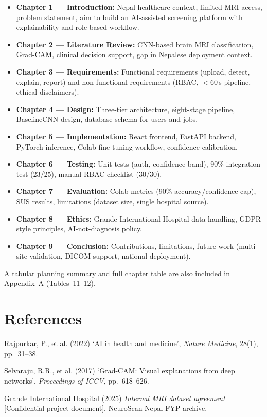\documentclass[11pt,a4paper]{article}
\begin{document}
\begin{itemize}[noitemsep]
  \item \textbf{Chapter 1 --- Introduction:} Nepal healthcare context, limited MRI access, problem statement, aim to build an AI-assisted screening platform with explainability and role-based workflow.
  \item \textbf{Chapter 2 --- Literature Review:} CNN-based brain MRI classification, Grad-CAM, clinical decision support, gap in Nepalese deployment context.
  \item \textbf{Chapter 3 --- Requirements:} Functional requirements (upload, detect, explain, report) and non-functional requirements (RBAC, $<$60\,s pipeline, ethical disclaimers).
  \item \textbf{Chapter 4 --- Design:} Three-tier architecture, eight-stage pipeline, BaselineCNN design, database schema for users and jobs.
  \item \textbf{Chapter 5 --- Implementation:} React frontend, FastAPI backend, PyTorch inference, Colab fine-tuning workflow, confidence calibration.
  \item \textbf{Chapter 6 --- Testing:} Unit tests (auth, confidence band), 90\% integration test (23/25), manual RBAC checklist (30/30).
  \item \textbf{Chapter 7 --- Evaluation:} Colab metrics (90\% accuracy/confidence cap), SUS results, limitations (dataset size, single hospital source).
  \item \textbf{Chapter 8 --- Ethics:} Grande International Hospital data handling, GDPR-style principles, AI-not-diagnosis policy.
  \item \textbf{Chapter 9 --- Conclusion:} Contributions, limitations, future work (multi-site validation, DICOM support, national deployment).
\end{itemize}

A tabular planning summary and full chapter table are also included in Appendix~A (Tables~11--12).

\section*{References}

\begin{enumerate}[label={[\arabic*]}, leftmargin=*, itemsep=0.25em]
  \item Rajpurkar, P., et al. (2022) `AI in health and medicine', \textit{Nature Medicine}, 28(1), pp.~31--38.
  \item Selvaraju, R.R., et al. (2017) `Grad-CAM: Visual explanations from deep networks', \textit{Proceedings of ICCV}, pp.~618--626.
  \item Grande International Hospital (2025) \textit{Internal MRI dataset agreement} [Confidential project document]. NeuroScan Nepal FYP archive.
\end{enumerate}
\end{document}
